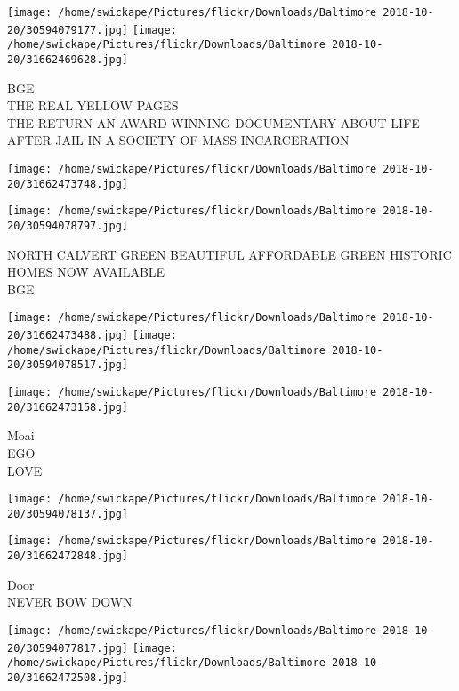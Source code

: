 \documentclass[10pt,letterpaper]{article}
\begin{document}
\vspace{0.25in}
\texttt{[image: /home/swickape/Pictures/flickr/Downloads/Baltimore 2018-10-20/30594079177.jpg]}
\texttt{[image: /home/swickape/Pictures/flickr/Downloads/Baltimore 2018-10-20/31662469628.jpg]}

BGE\\
THE REAL YELLOW PAGES\\
THE RETURN AN AWARD WINNING DOCUMENTARY ABOUT LIFE AFTER JAIL IN A SOCIETY OF MASS INCARCERATION\\
\pagebreak

\texttt{[image: /home/swickape/Pictures/flickr/Downloads/Baltimore 2018-10-20/31662473748.jpg]}

\vspace{0.25in}
\texttt{[image: /home/swickape/Pictures/flickr/Downloads/Baltimore 2018-10-20/30594078797.jpg]}

NORTH CALVERT GREEN BEAUTIFUL AFFORDABLE GREEN HISTORIC HOMES NOW AVAILABLE\\
BGE\\
\pagebreak

\texttt{[image: /home/swickape/Pictures/flickr/Downloads/Baltimore 2018-10-20/31662473488.jpg]}
\texttt{[image: /home/swickape/Pictures/flickr/Downloads/Baltimore 2018-10-20/30594078517.jpg]}

\texttt{[image: /home/swickape/Pictures/flickr/Downloads/Baltimore 2018-10-20/31662473158.jpg]}

Moai\\
EGO\\
LOVE\\
\pagebreak

\texttt{[image: /home/swickape/Pictures/flickr/Downloads/Baltimore 2018-10-20/30594078137.jpg]}

\vspace{0.25in}
\texttt{[image: /home/swickape/Pictures/flickr/Downloads/Baltimore 2018-10-20/31662472848.jpg]}

Door\\
NEVER BOW DOWN\\
\pagebreak

\texttt{[image: /home/swickape/Pictures/flickr/Downloads/Baltimore 2018-10-20/30594077817.jpg]}
\texttt{[image: /home/swickape/Pictures/flickr/Downloads/Baltimore 2018-10-20/31662472508.jpg]}
\end{document}
